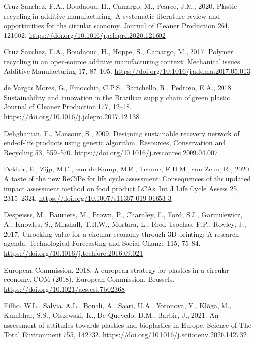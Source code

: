 \documentclass[12pt]{elsarticle} %
\newlength{\cslhangindent}
\newlength{\cslentryspacingunit} %
\newenvironment{CSLReferences}[2] %
 {%
  \setlength{\parindent}{0pt}
  \ifodd #1
  \let\oldpar\par
  \def\par{\hangindent=\cslhangindent\oldpar}
  \fi
  \setlength{\parskip}{#2\cslentryspacingunit}
 }%
 {}
\begin{document}
\begin{CSLReferences}{1}{0}
\leavevmode{}%
Cruz Sanchez, F.A., Boudaoud, H., Camargo, M., Pearce, J.M., 2020. Plastic recycling in additive manufacturing: {A} systematic literature review and opportunities for the circular economy. Journal of Cleaner Production 264, 121602. \url{https://doi.org/10.1016/j.jclepro.2020.121602}

\leavevmode{}%
Cruz Sanchez, F.A., Boudaoud, H., Hoppe, S., Camargo, M., 2017. Polymer recycling in an open-source additive manufacturing context: {Mechanical} issues. Additive Manufacturing 17, 87--105. \url{https://doi.org/10.1016/j.addma.2017.05.013}

\leavevmode{}%
de Vargas Mores, G., Finocchio, C.P.S., Barichello, R., Pedrozo, E.A., 2018. Sustainability and innovation in the {Brazilian} supply chain of green plastic. Journal of Cleaner Production 177, 12--18. \url{https://doi.org/10.1016/j.jclepro.2017.12.138}

\leavevmode{}%
Dehghanian, F., Mansour, S., 2009. Designing sustainable recovery network of end-of-life products using genetic algorithm. Resources, Conservation and Recycling 53, 559--570. \url{https://doi.org/10.1016/j.resconrec.2009.04.007}

\leavevmode{}%
Dekker, E., Zijp, M.C., van de Kamp, M.E., Temme, E.H.M., van Zelm, R., 2020. A taste of the new {ReCiPe} for life cycle assessment: Consequences of the updated impact assessment method on food product {LCAs}. Int J Life Cycle Assess 25, 2315--2324. \url{https://doi.org/10.1007/s11367-019-01653-3}

\leavevmode{}%
Despeisse, M., Baumers, M., Brown, P., Charnley, F., Ford, S.J., Garmulewicz, A., Knowles, S., Minshall, T.H.W., Mortara, L., Reed-Tsochas, F.P., Rowley, J., 2017. Unlocking value for a circular economy through {3D} printing: {A} research agenda. Technological Forecasting and Social Change 115, 75--84. \url{https://doi.org/10.1016/j.techfore.2016.09.021}

\leavevmode{}%
European Commission, 2018. A european strategy for plastics in a circular economy, COM (2018). {European Commission}, {Brussels}. \url{https://doi.org/10.1021/acs.est.7b02368}

\leavevmode{}%
Filho, W.L., Salvia, A.L., Bonoli, A., Saari, U.A., Voronova, V., Klõga, M., Kumbhar, S.S., Olszewski, K., De Quevedo, D.M., Barbir, J., 2021. An assessment of attitudes towards plastics and bioplastics in {Europe}. Science of The Total Environment 755, 142732. \url{https://doi.org/10.1016/j.scitotenv.2020.142732}


\end{CSLReferences}
\end{document}

